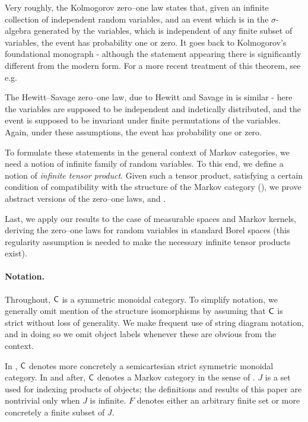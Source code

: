 \documentclass[11pt]{article}
\begin{document}
Very roughly, the Kolmogorov zero--one law states that, given an infinite collection of independent random variables, and an event which is in the $\sigma$-algebra generated by the variables, which is independent of any finite subset of variables, the event has probability one or zero.
It goes back to Kolmogorov's foundational monograph \cite{kolmogorovgerm} - although the statement appearing there is significantly different from the modern form.
For a more recent treatment of this theorem, see e.g. \cite[Theorem~2.37]{klemke}


The Hewitt--Savage zero--one law, due to Hewitt and Savage in \cite[Theorem~11.3]{hewitt_savage} is similar - here the variables are supposed to be independent and indetically distributed, and the event is supposed to be invariant under finite permutations of the variables. Again, under these assumptions, the event has probability one or zero.

To formulate these statements in the general context of Markov categories, we need a notion of infinite family of random variables.
To this end, we define a notion of \emph{infinite tensor product}. Given such a tensor product, satisfying a certain condition of compatibility with the structure of the Markov category (), we prove abstract versions of the zero--one laws,  and .

Last, we apply our results to the case of measurable spaces and Markov kernels, deriving the zero--one laws for random variables in standard Borel spaces (this regularity assumption is needed to make the necessary infinite tensor products exist).

\paragraph*{Notation.} 

Throughout, $\mathsf{C}$ is a symmetric monoidal category. To simplify notation, we generally omit mention of the structure isomorphisms by assuming that $\mathsf{C}$ is strict without loss of generality. We make frequent use of string diagram notation, and in doing so we omit object labels whenever these are obvious from the context.

In , $\mathsf{C}$ denotes more concretely a semicartesian strict symmetric monoidal category. In  and after, $\mathsf{C}$ denotes a Markov category in the sense of . $J$ is a set used for indexing products of objects; the definitions and results of this paper are nontrivial only when $J$ is infinite. $F$ denotes either an arbitrary finite set or more concretely a finite subset of $J$.
\end{document}
